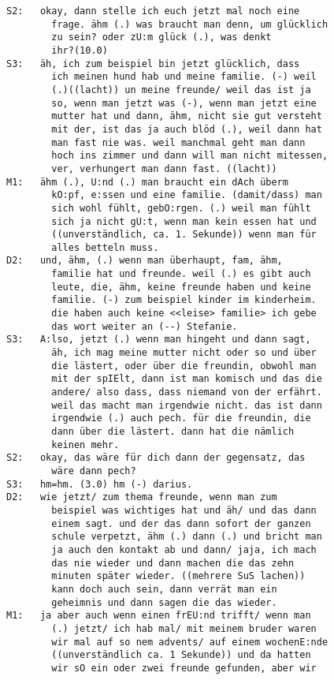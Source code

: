 \begin{lstlisting}[language={}]
S2:   okay, dann stelle ich euch jetzt mal noch eine
        frage. ähm (.) was braucht man denn, um glücklich 
        zu sein? oder zU:m glück (.), was denkt 
        ihr?(10.0)
S3:   äh, ich zum beispiel bin jetzt glücklich, dass 
        ich meinen hund hab und meine familie. (-) weil 
        (.)((lacht)) un meine freunde/ weil das ist ja 
        so, wenn man jetzt was (-), wenn man jetzt eine 
        mutter hat und dann, ähm, nicht sie gut versteht 
        mit der, ist das ja auch blöd (.), weil dann hat
        man fast nie was. weil manchmal geht man dann 
        hoch ins zimmer und dann will man nicht mitessen, 
        ver, verhungert man dann fast. ((lacht))
M1:   ähm (.), U:nd (.) man braucht ein dAch überm 
        kO:pf, e:ssen und eine familie. (damit/dass) man 
        sich wohl fühlt, gebO:rgen. (.) weil man fühlt 
        sich ja nicht gU:t, wenn man kein essen hat und 
        ((unverständlich, ca. 1. Sekunde)) wenn man für
        alles betteln muss.
D2:   und, ähm, (.) wenn man überhaupt, fam, ähm,
        familie hat und freunde. weil (.) es gibt auch 
        leute, die, ähm, keine freunde haben und keine 
        familie. (-) zum beispiel kinder im kinderheim.
        die haben auch keine <<leise> familie> ich gebe
        das wort weiter an (--) Stefanie.
S3:   A:lso, jetzt (.) wenn man hingeht und dann sagt,
        äh, ich mag meine mutter nicht oder so und über 
        die lästert, oder über die freundin, obwohl man 
        mit der spIElt, dann ist man komisch und das die 
        andere/ also dass, dass niemand von der erfährt. 
        weil das macht man irgendwie nicht. das ist dann
        irgendwie (.) auch pech. für die freundin, die 
        dann über die lästert. dann hat die nämlich
        keinen mehr.
S2:   okay, das wäre für dich dann der gegensatz, das 
        wäre dann pech?
S3:   hm=hm. (3.0) hm (-) darius.
D2:   wie jetzt/ zum thema freunde, wenn man zum 
        beispiel was wichtiges hat und äh/ und das dann 
        einem sagt. und der das dann sofort der ganzen 
        schule verpetzt, ähm (.) dann (.) und bricht man
        ja auch den kontakt ab und dann/ jaja, ich mach
        das nie wieder und dann machen die das zehn 
        minuten später wieder. ((mehrere SuS lachen))
        kann doch auch sein, dann verrät man ein 
        geheimnis und dann sagen die das wieder.
M1:   ja aber auch wenn einen frEU:nd trifft/ wenn man
        (.) jetzt/ ich hab mal/ mit meinem bruder waren 
        wir mal auf so nem advents/ auf einem wochenE:nde
        ((unverständlich ca. 1 Sekunde)) und da hatten
        wir sO ein oder zwei freunde gefunden, aber wir 

\end{lstlisting}

